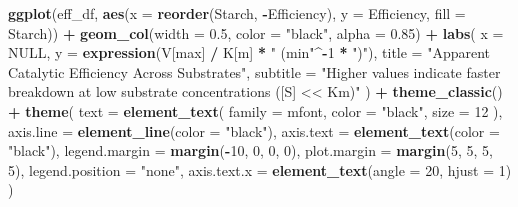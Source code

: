 \documentclass[
  12pt,
]{article}
\newenvironment{Shaded}{\begin{snugshade}}{\end{snugshade}}
\newcommand{\AttributeTok}[1]{\textcolor[rgb]{0.13,0.29,0.53}{#1}}
\newcommand{\ConstantTok}[1]{\textcolor[rgb]{0.56,0.35,0.01}{#1}}
\newcommand{\DecValTok}[1]{\textcolor[rgb]{0.00,0.00,0.81}{#1}}
\newcommand{\FloatTok}[1]{\textcolor[rgb]{0.00,0.00,0.81}{#1}}
\newcommand{\FunctionTok}[1]{\textcolor[rgb]{0.13,0.29,0.53}{\textbf{#1}}}
\newcommand{\NormalTok}[1]{#1}
\newcommand{\SpecialCharTok}[1]{\textcolor[rgb]{0.81,0.36,0.00}{\textbf{#1}}}
\newcommand{\StringTok}[1]{\textcolor[rgb]{0.31,0.60,0.02}{#1}}
\newcounter{none} %
\begin{document}
\begin{Shaded}
\begin{Highlighting}[]
\FunctionTok{ggplot}\NormalTok{(eff\_df, }\FunctionTok{aes}\NormalTok{(}\AttributeTok{x =} \FunctionTok{reorder}\NormalTok{(Starch, }\SpecialCharTok{{-}}\NormalTok{Efficiency), }\AttributeTok{y =}\NormalTok{ Efficiency, }
                   \AttributeTok{fill =}\NormalTok{ Starch)) }\SpecialCharTok{+}
  \FunctionTok{geom\_col}\NormalTok{(}\AttributeTok{width =} \FloatTok{0.5}\NormalTok{, }\AttributeTok{color =} \StringTok{"black"}\NormalTok{, }\AttributeTok{alpha =} \FloatTok{0.85}\NormalTok{) }\SpecialCharTok{+}
  \FunctionTok{labs}\NormalTok{(}
    \AttributeTok{x =} \ConstantTok{NULL}\NormalTok{,}
    \AttributeTok{y =} \FunctionTok{expression}\NormalTok{(V[max] }\SpecialCharTok{/}\NormalTok{ K[m] }\SpecialCharTok{*} \StringTok{" (min"}\SpecialCharTok{\^{}{-}}\DecValTok{1} \SpecialCharTok{*} \StringTok{")"}\NormalTok{),}
    \AttributeTok{title =} \StringTok{"Apparent Catalytic Efficiency Across Substrates"}\NormalTok{,}
    \AttributeTok{subtitle =} \StringTok{"Higher values indicate faster breakdown}
\StringTok{    at low substrate concentrations ([S] \textless{}\textless{} Km)"}
\NormalTok{  ) }\SpecialCharTok{+}
  \FunctionTok{theme\_classic}\NormalTok{() }\SpecialCharTok{+}
  \FunctionTok{theme}\NormalTok{(}
    \AttributeTok{text =} \FunctionTok{element\_text}\NormalTok{(}
      \AttributeTok{family =}\NormalTok{ mfont,}
      \AttributeTok{color =} \StringTok{"black"}\NormalTok{,}
      \AttributeTok{size =} \DecValTok{12}
\NormalTok{    ),}
    \AttributeTok{axis.line =} \FunctionTok{element\_line}\NormalTok{(}\AttributeTok{color =} \StringTok{"black"}\NormalTok{),}
    \AttributeTok{axis.text =} \FunctionTok{element\_text}\NormalTok{(}\AttributeTok{color =} \StringTok{"black"}\NormalTok{),}
    \AttributeTok{legend.margin =} \FunctionTok{margin}\NormalTok{(}\SpecialCharTok{{-}}\DecValTok{10}\NormalTok{, }\DecValTok{0}\NormalTok{, }\DecValTok{0}\NormalTok{, }\DecValTok{0}\NormalTok{),}
    \AttributeTok{plot.margin =} \FunctionTok{margin}\NormalTok{(}\DecValTok{5}\NormalTok{, }\DecValTok{5}\NormalTok{, }\DecValTok{5}\NormalTok{, }\DecValTok{5}\NormalTok{),}
    \AttributeTok{legend.position =} \StringTok{"none"}\NormalTok{,}
    \AttributeTok{axis.text.x =} \FunctionTok{element\_text}\NormalTok{(}\AttributeTok{angle =} \DecValTok{20}\NormalTok{, }\AttributeTok{hjust =} \DecValTok{1}\NormalTok{)}
\NormalTok{  )}
\end{Highlighting}
\end{Shaded}
\end{document}
